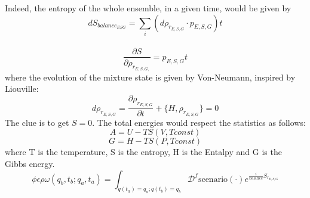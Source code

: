 \documentclass{article}
\begin{document}
Indeed, the entropy of the whole ensemble, in a given time, would be given by
\begin{equation}
    dS_{balance_{ESG}} = \sum_i (d\rho_{r_{E,S,G}} \cdot p_{E,S,G}) t
\end{equation}\\
\begin{equation}
    \frac{\partial S}{\partial \rho_{r_{E,S,G,}}} = p_{E,S,G} t
\end{equation}
where the evolution of the mixture state is given by Von-Neumann, inspired by Liouville:
\begin{equation}
    d\rho_{r_{E,S,G}} = \frac{\partial{\rho_{r_{E,S,G}}}}{\partial t} + \{H, \rho_{r_{E,S,G}}\} =0
\end{equation}
The clue is to get $S = 0$.
The total energies would respect the statistics as follows:
\begin{equation}
    A = U - TS (V,T const)
\end{equation}
\begin{equation}
    G = H - TS (P, T const)
\end{equation}
where T is the temperature, S is the entropy, H is the Entalpy and G is the Gibbs energy.
\begin{equation}
\phi\epsilon\rho\omega(q_b, t_b; q_a, t_a) = \int_{q(t_a)=q_a; q(t_b)=q_b} \mathcal{D}^f \text{scenario}(\cdot) e^{\frac{i}{\text{balance}} S_{r_{E,S,G}}}
\end{equation}
\end{document}
